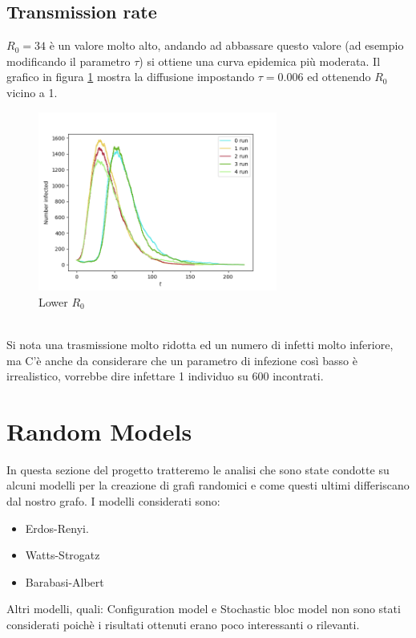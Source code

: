 \documentclass[a4paper]{article}
\begin{document}
\subsection{Transmission rate}
$R_0 = 34$ è un valore molto alto, andando ad abbassare questo valore (ad esempio modificando il parametro $\tau$) si ottiene una curva epidemica più moderata.
Il grafico in figura \ref{FIG:transmission_rate_06_1_random} mostra la diffusione impostando $\tau = 0.006$ ed ottenendo $R_0$ vicino a 1.\\
\begin{figure}[!ht]
\centering
\includegraphics[width=0.7\textwidth]{transmission_rate_06_1_random.png}
\caption{Lower $R_0$} \label{FIG:transmission_rate_06_1_random}
\end{figure}\\
Si nota una trasmissione molto ridotta ed un numero di infetti molto inferiore, ma C'è anche da considerare che un parametro di infezione così basso è irrealistico, vorrebbe dire infettare 1 individuo su 600 incontrati.


\newpage
\section{Random Models}
In questa sezione del progetto tratteremo le analisi che sono state condotte su alcuni modelli per la creazione di grafi randomici e come questi ultimi differiscano dal nostro grafo.
I modelli considerati sono:
\begin{itemize}
	\item Erdos-Renyi.
	\item Watts-Strogatz
	\item Barabasi-Albert
\end{itemize}
Altri modelli, quali: Configuration	model e Stochastic bloc model non sono stati considerati poichè i risultati ottenuti erano poco interessanti o rilevanti.
\end{document}
